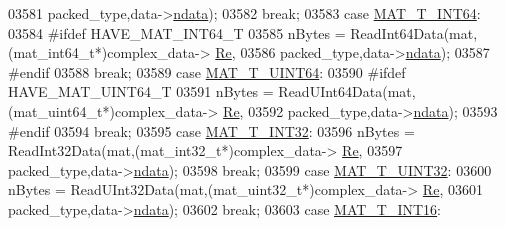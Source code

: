 \begin{DoxyCode}
{{{{{{{{{{{{{{{{{{03581                                 packed\_type,data->\hyperlink{group___m_a_t_a1beb8a8c58a808207cbea650563a9b63}{ndata});
03582                             \textcolor{keywordflow}{break};
03583                         \textcolor{keywordflow}{case} \hyperlink{group___m_a_t_ggacf7b3b879282b7ab3a51190e49bf3453a9e825b5d18b8f946eaf2b4b57e51c145}{MAT\_T\_INT64}:
03584 \textcolor{preprocessor}{#ifdef HAVE\_MAT\_INT64\_T}
03585                             nBytes = ReadInt64Data(mat,(mat\_int64\_t*)complex\_data->
      \hyperlink{group___m_a_t_a484a93607508adac2bce53a0252e0325}{Re},
03586                                 packed\_type,data->\hyperlink{group___m_a_t_a1beb8a8c58a808207cbea650563a9b63}{ndata});
03587 \textcolor{preprocessor}{#endif}
03588                             \textcolor{keywordflow}{break};
03589                         \textcolor{keywordflow}{case} \hyperlink{group___m_a_t_ggacf7b3b879282b7ab3a51190e49bf3453a45547932c46be27118abe08302d7e29f}{MAT\_T\_UINT64}:
03590 \textcolor{preprocessor}{#ifdef HAVE\_MAT\_UINT64\_T}
03591                             nBytes = ReadUInt64Data(mat,(mat\_uint64\_t*)complex\_data->
      \hyperlink{group___m_a_t_a484a93607508adac2bce53a0252e0325}{Re},
03592                                 packed\_type,data->\hyperlink{group___m_a_t_a1beb8a8c58a808207cbea650563a9b63}{ndata});
03593 \textcolor{preprocessor}{#endif}
03594                             \textcolor{keywordflow}{break};
03595                         \textcolor{keywordflow}{case} \hyperlink{group___m_a_t_ggacf7b3b879282b7ab3a51190e49bf3453a83e06a68320726c6572bfbb9f3addb1d}{MAT\_T\_INT32}:
03596                             nBytes = ReadInt32Data(mat,(mat\_int32\_t*)complex\_data->
      \hyperlink{group___m_a_t_a484a93607508adac2bce53a0252e0325}{Re},
03597                                 packed\_type,data->\hyperlink{group___m_a_t_a1beb8a8c58a808207cbea650563a9b63}{ndata});
03598                             \textcolor{keywordflow}{break};
03599                         \textcolor{keywordflow}{case} \hyperlink{group___m_a_t_ggacf7b3b879282b7ab3a51190e49bf3453aa397e285a23fe240368b752897652c6a}{MAT\_T\_UINT32}:
03600                             nBytes = ReadUInt32Data(mat,(mat\_uint32\_t*)complex\_data->
      \hyperlink{group___m_a_t_a484a93607508adac2bce53a0252e0325}{Re},
03601                                 packed\_type,data->\hyperlink{group___m_a_t_a1beb8a8c58a808207cbea650563a9b63}{ndata});
03602                             \textcolor{keywordflow}{break};
03603                         \textcolor{keywordflow}{case} \hyperlink{group___m_a_t_ggacf7b3b879282b7ab3a51190e49bf3453a8c5b2e381946e95ea8d81ac216743302}{MAT\_T\_INT16}:
}}}}}}}}}}}}}}}}}}
\end{DoxyCode}
